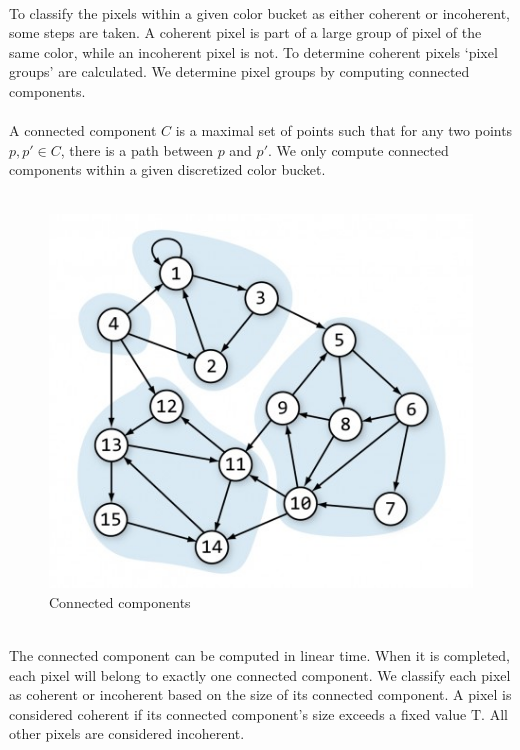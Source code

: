 \documentclass{report}
\begin{document}
\\
To classify the pixels within a given color bucket as either coherent or incoherent, some steps are taken. A coherent pixel is part of a large group of pixel of the same color, while an incoherent pixel is not. To determine coherent pixels ‘pixel groups’ are calculated. We determine pixel groups by computing connected components.\\
\\
A connected component $C$ is a maximal set of points such that for any two points $p,p' \in C$, there is a path between $p$ and $p'$. We only compute connected components within a given discretized color bucket.\\
\\
\begin{figure}[!h]
\centering
        \includegraphics[width=.4\linewidth]{connected.jpg}
    \caption{Connected components}
    \label{fig:connected}
\end{figure}
\\
The connected component can be computed in linear time. When it is completed, each pixel will belong to exactly one connected component. We classify each pixel as coherent or incoherent based on the size of its connected component. A pixel is considered coherent if its connected component’s size exceeds a fixed value $\mathrm{T}$. All other pixels are considered incoherent.\\
\end{document}
